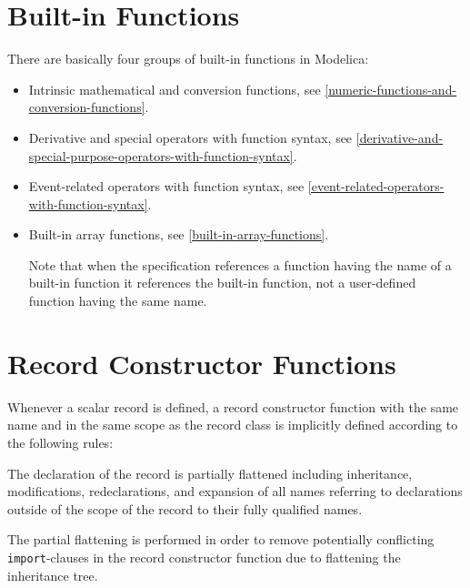 \section{Built-in Functions}\label{built-in-functions}

There are basically four groups of built-in functions in Modelica:
\begin{itemize}
\item
  Intrinsic mathematical and conversion functions, see \cref{numeric-functions-and-conversion-functions}.
\item
  Derivative and special operators with function syntax, see \cref{derivative-and-special-purpose-operators-with-function-syntax}.
\item
  Event-related operators with function syntax, see \cref{event-related-operators-with-function-syntax}.
\item
  Built-in array functions, see \cref{built-in-array-functions}.

  Note that when the specification references a function having the name of a built-in function it references the built-in function, not a user-defined function having the same name.
\end{itemize}

\section{Record Constructor Functions}\label{record-constructor-functions}

Whenever a scalar record is defined, a record constructor function with the same name and in the same scope as the record class is implicitly defined according to the following rules:

The declaration of the record is partially flattened including inheritance, modifications, redeclarations, and expansion of all names referring to declarations outside of the scope of the record to their fully qualified names.

\begin{nonnormative}
The partial flattening is performed in order to remove potentially conflicting \lstinline!import!-clauses in the record constructor function due to flattening the inheritance tree.
\end{nonnormative}

